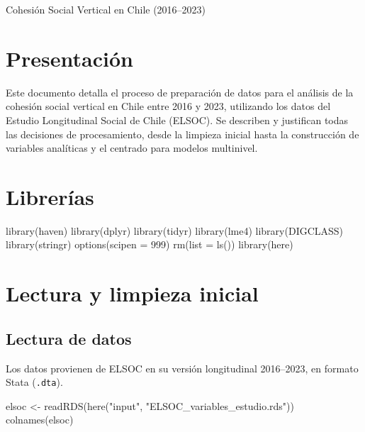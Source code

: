 \documentclass[
  spanish,
  a4paper,
  oneside]{scrbook}
\newenvironment{Shaded}{\begin{snugshade}}{\end{snugshade}}
\newcommand{\AttributeTok}[1]{\textcolor[rgb]{0.40,0.45,0.13}{#1}}
\newcommand{\DecValTok}[1]{\textcolor[rgb]{0.68,0.00,0.00}{#1}}
\newcommand{\FunctionTok}[1]{\textcolor[rgb]{0.28,0.35,0.67}{#1}}
\newcommand{\NormalTok}[1]{\textcolor[rgb]{0.00,0.23,0.31}{#1}}
\newcommand{\OtherTok}[1]{\textcolor[rgb]{0.00,0.23,0.31}{#1}}
\newcommand{\StringTok}[1]{\textcolor[rgb]{0.13,0.47,0.30}{#1}}
\begin{document}
Cohesión Social Vertical en Chile (2016--2023)

\hfill\break

\chapter{Presentación}\label{presentaciuxf3n}

Este documento detalla el proceso de preparación de datos para el
análisis de la cohesión social vertical en Chile entre 2016 y 2023,
utilizando los datos del Estudio Longitudinal Social de Chile (ELSOC).
Se describen y justifican todas las decisiones de procesamiento, desde
la limpieza inicial hasta la construcción de variables analíticas y el
centrado para modelos multinivel.

\chapter{Librerías}\label{libreruxedas}

\begin{Shaded}
\begin{Highlighting}[]
\FunctionTok{library}\NormalTok{(haven)}
\FunctionTok{library}\NormalTok{(dplyr)}
\FunctionTok{library}\NormalTok{(tidyr)}
\FunctionTok{library}\NormalTok{(lme4)}
\FunctionTok{library}\NormalTok{(DIGCLASS)}
\FunctionTok{library}\NormalTok{(stringr)}
\FunctionTok{options}\NormalTok{(}\AttributeTok{scipen =} \DecValTok{999}\NormalTok{)}
\FunctionTok{rm}\NormalTok{(}\AttributeTok{list =} \FunctionTok{ls}\NormalTok{())}
\FunctionTok{library}\NormalTok{(here)}
\end{Highlighting}
\end{Shaded}

\chapter{Lectura y limpieza inicial}\label{lectura-y-limpieza-inicial}

\section{Lectura de datos}\label{lectura-de-datos}

Los datos provienen de ELSOC en su versión longitudinal 2016--2023, en
formato Stata (\texttt{.dta}).

\begin{Shaded}
\begin{Highlighting}[]
\NormalTok{elsoc }\OtherTok{\textless{}{-}} \FunctionTok{readRDS}\NormalTok{(}\FunctionTok{here}\NormalTok{(}\StringTok{"input"}\NormalTok{, }\StringTok{"ELSOC\_variables\_estudio.rds"}\NormalTok{))}
\FunctionTok{colnames}\NormalTok{(elsoc)}
\end{Highlighting}
\end{Shaded}
\end{document}
